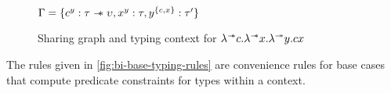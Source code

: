 \begin{figure}[h]
  \begin{framed}\centering
    \begin{minipage}{0.3\linewidth}
  \end{minipage}
  \begin{minipage}{0.4\linewidth}
    $\Gamma = \{ c^{y}:\tau \mathrel{-\mkern-6mu*} \upsilon, x^{y}:\tau, y^{\{c,x\}}:\tau' \}$
  \end{minipage}
  \end{framed}
  \caption{Sharing graph and typing context for $\lambda^{\mathrel{-\mkern-6mu*}} c. \lambda^{\mathrel{-\mkern-6mu*}}  x. \lambda^{\twoheadrightarrow}y. c x$}
  \label{fig:example-sharing-graph}
\end{figure}

The rules given in \cref{fig:bi-base-typing-rules}
are convenience rules for base cases that compute predicate constraints for types within a context.

